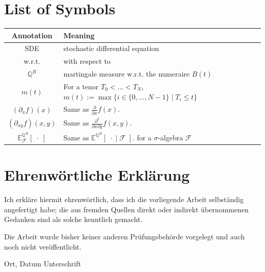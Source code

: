 \documentclass[12pt]{article}
\begin{document}
	\section{List of Symbols}
	\begin{tabular}{cl}
		
		Annotation & Meaning \\
		\hline
		SDE & stochastic differential equation \\
		w.r.t. & with respect to \\
		$\mathbb{Q}^B$ & martingale measure w.r.t. the numeraire $B(t)$\\
		$m(t)$ & For a tenor $T_0 < ... < T_N$, $m(t):= \max\{i \in \{0, ..., N-1\} \; | \; T_i \le t \}$\\
		$(\partial_{x}f)(x)$ & Same as $\frac{\partial}{\partial x}f(x)$.\\
		$(\partial_{x y}f)(x, y)$ & Same as $\frac{\partial^2}{\partial x \partial y}f(x, y)$.\\
		$\mathbb{E}^{\mathbb{Q}^B}_{\mathcal{F}}\left[ \; \cdot \; \right]$ & Same as
		$\mathbb{E}^{\mathbb{Q}^B}\left[ \; \cdot \; | \; \mathcal{F} \; \right].$ for a $\sigma$-algebra $\mathcal{F}$\\
		
	\end{tabular}
	\pagebreak
		
		
		
		
		
		
	\newpage
	\thispagestyle{empty}
	\clearpage
	
	\section*{Ehrenwörtliche Erklärung}
	
	Ich erkläre hiermit ehrenwörtlich, dass ich die vorliegende Arbeit selbständig angefertigt habe; die aus fremden Quellen direkt oder indirekt übernommenen Gedanken sind als solche kenntlich gemacht.
	\par \bigskip
	\noindent Die Arbeit wurde bisher keiner anderen Prüfungsbehörde vorgelegt und auch noch nicht veröffentlicht.
	
	\vspace{4cm}
	
	\hspace{2cm} Ort, Datum \hfill Unterschrift \hspace{2cm}
	\pagebreak
\end{document}
